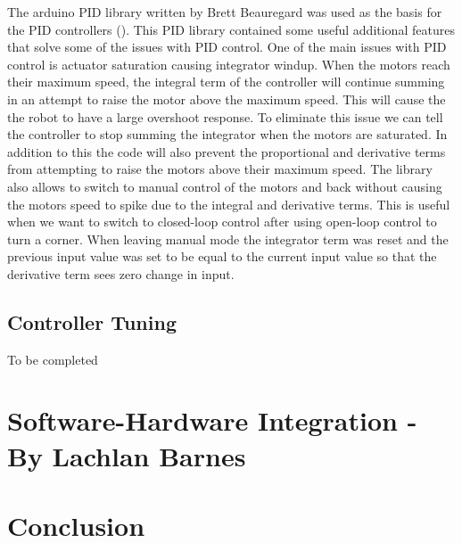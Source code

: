 \documentclass[11pt]{article}
\begin{document}
\par The arduino PID library written by Brett Beauregard was used as the basis for the PID controllers (\cite{beauregardPID}). This PID library contained some useful additional features that solve some of the issues with PID control. One of the main issues with PID control is actuator saturation causing integrator windup. When the motors reach their maximum speed, the integral term of the controller will continue summing in an attempt to raise the motor above the maximum speed. This will cause the the robot to have a large overshoot response. To eliminate this issue we can tell the controller to stop summing the integrator when the motors are saturated. In addition to this the code will also prevent the proportional and derivative terms from attempting to raise the motors above their maximum speed. The library also allows to switch to manual control of the motors and back without causing the motors speed to spike due to the integral and derivative terms. This is useful when we want to switch to closed-loop control after using open-loop control to turn a corner. When leaving manual mode the integrator term was reset and the previous input value was set to be equal to the current input value so that the derivative term sees zero change in input.

\subsection{Controller Tuning}
To be completed

\newpage
\section{Software-Hardware Integration - By Lachlan Barnes}

\section{Conclusion}
\printbibliography
\end{document}
